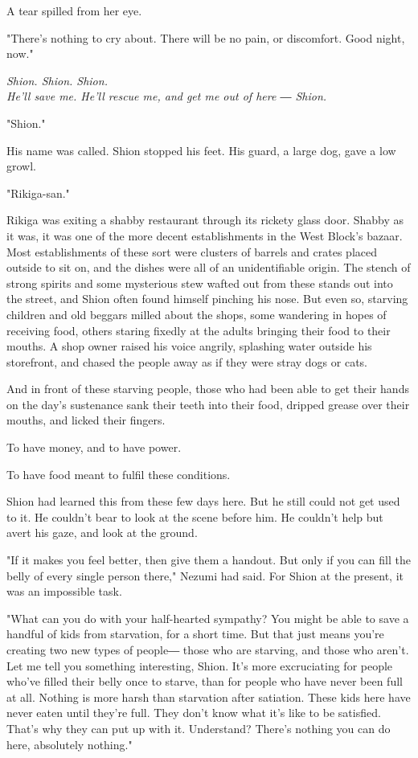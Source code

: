 A tear spilled from her eye.

"There's nothing to cry about. There will be no pain, or discomfort.
Good night, now."

\myspace

\emph{Shion. Shion. Shion.\\
	He'll save me. He'll rescue me, and get me out of here ― Shion.}

\myspace

"Shion."

His name was called. Shion stopped his feet. His guard, a large dog,
gave a low growl.

"Rikiga-san."

Rikiga was exiting a shabby restaurant through its rickety glass door.
Shabby as it was, it was one of the more decent establishments in the
West Block's bazaar. Most establishments of these sort were clusters of
barrels and crates placed outside to sit on, and the dishes were all of
an unidentifiable origin. The stench of strong spirits and some
mysterious stew wafted out from these stands out into the street, and
Shion often found himself pinching his nose. But even so, starving
children and old beggars milled about the shops, some wandering in hopes
of receiving food, others staring fixedly at the adults bringing their
food to their mouths. A shop owner raised his voice angrily, splashing
water outside his storefront, and chased the people away as if they were
stray dogs or cats.

And in front of these starving people, those who had been able to get
their hands on the day's sustenance sank their teeth into their food,
dripped grease over their mouths, and licked their fingers.

To have money, and to have power.

To have food meant to fulfil these conditions.

Shion had learned this from these few days here. But he still could not
get used to it. He couldn't bear to look at the scene before him. He
couldn't help but avert his gaze, and look at the ground.

"If it makes you feel better, then give them a handout. But only if you
can fill the belly of every single person there," Nezumi had said. For
Shion at the present, it was an impossible task.

"What can you do with your half-hearted sympathy? You might be able to
save a handful of kids from starvation, for a short time. But that just
means you're creating two new types of people― those who are starving,
and those who aren't. Let me tell you something interesting, Shion. It's
more excruciating for people who've filled their belly once to starve,
than for people who have never been full at all. Nothing is more harsh
than starvation after satiation. These kids here have never eaten until
they're full. They don't know what it's like to be satisfied. That's why
they can put up with it. Understand? There's nothing you can do here,
absolutely nothing."

